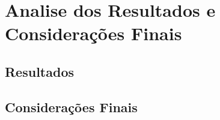 \chapter{Analise dos Resultados e Considerações Finais}\label{cap:apresAnaRes}




\section{Resultados}

\section{Considerações Finais}





